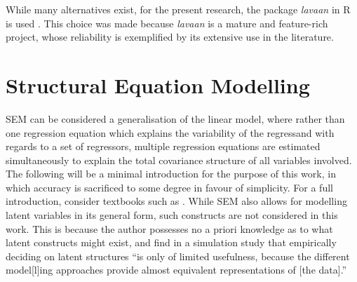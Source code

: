 While many alternatives exist, for the present research, the package \textit{lavaan} in R is used \cite{rosseel2012lavaan}.
This choice was made because \textit{lavaan} is a mature and feature-rich project, whose reliability is exemplified by its
extensive use in the literature.

\section{Structural Equation Modelling}
\label{sec:methods:sem}
SEM can be considered a generalisation of the linear model, where rather than one regression equation which explains
the variability of the regressand with regards to a set of regressors, multiple regression equations are estimated simultaneously
to explain the total covariance structure of all variables involved.
The following will be a minimal introduction for the purpose of this work, in which accuracy is sacrificed to some degree
in favour of simplicity.
For a full introduction, consider textbooks such as .
While SEM also allows for modelling latent variables in its general form, such constructs are not considered
in this work. This is because the author possesses no a priori knowledge as to what latent constructs might exist, and
 find in a simulation study that empirically deciding on latent structures ``is only
of limited usefulness, because the different model[l]ing approaches provide almost equivalent representations of [the data].''

